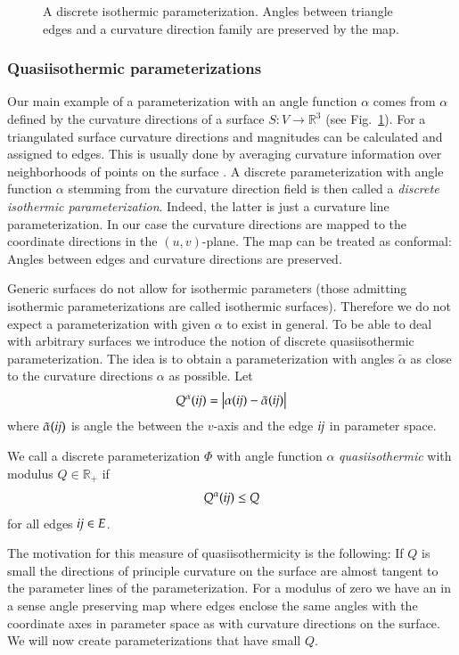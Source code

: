 \documentclass[Thesis.tex]{subfiles}
\begin{document}
\begin{figure}
\centering
\resizebox{\textwidth}{!}{}
\caption{A discrete isothermic parameterization. Angles between triangle edges 
and a curvature direction family are preserved by the map.}
\label{fig:isothermic_parameterization}
\end{figure}

\subsubsection{Quasiisothermic parameterizations}
Our main example of a parameterization with an angle function $\alpha$ comes
from $\alpha$ defined by the curvature directions of a surface $S:V\to
\mathbb R^3$ (see Fig.~\ref{fig:isothermic_parameterization}). For a triangulated surface 
curvature directions and magnitudes can be calculated and assigned to edges. This 
is usually done by averaging curvature information over neighborhoods of points 
on the surface \cite{CohMor03}. A discrete parameterization 
with angle function $\alpha$ stemming from the curvature direction field is then called a
\emph{discrete isothermic parameterization}. Indeed, the latter is just a
curvature line parameterization. In our case the curvature directions
are mapped to the coordinate directions in the $(u,v)$-plane. The map can be
treated as conformal: Angles between edges and curvature directions are 
preserved.

Generic surfaces do not allow for isothermic parameters (those admitting
isothermic parameterizations are called isothermic surfaces). Therefore we do
not expect a parameterization with given $\alpha$ to exist in general. To be
able to deal with arbitrary surfaces we introduce the notion of discrete
quasiisothermic parameterization. The idea is to obtain a parameterization with
angles $\tilde\alpha$ as close to the curvature directions $\alpha$ as possible.
Let
\begin{equation}
Q^\alpha(\mathrm{\it{ij}})=\left|\alpha(\mathrm{\it{ij}}) - \tilde\alpha(\mathrm{\it{ij}})\right|
\label{eq:quasiisothermicity}
\end{equation}
where $\tilde\alpha(\mathrm{\it{ij}})$ is angle the between the $v$-axis and the edge $\mathrm{\it{ij}}$ in 
parameter space.
\begin{definition}
We call a discrete parameterization $\Phi$ with angle function $\alpha$ 
\emph{quasiisothermic} with modulus $Q\in \mathbb R_+$ if
\begin{equation}
Q^\alpha(\mathrm{\it{ij}}) \leq Q
\end{equation}
for all edges $\mathrm{\it{ij}}\in E$.
\end{definition}
The motivation for this measure of quasiisothermicity is the following: If $Q$ is small
the directions of principle curvature on the surface are almost tangent to the parameter 
lines of the parameterization. For a modulus of zero we have an in a sense angle 
preserving map where edges enclose the same angles with the coordinate axes in 
parameter space as with curvature directions on the surface. We will now 
create parameterizations that have small $Q$.
\end{document}
